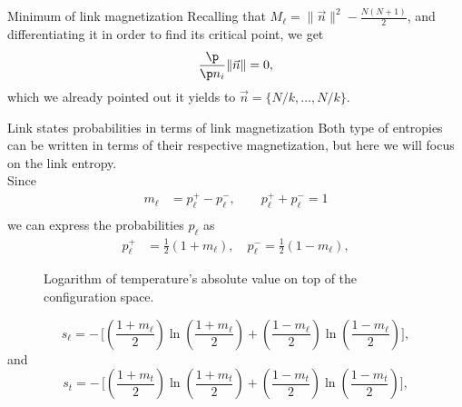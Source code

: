 \begin{frame}{Minimum of link magnetization}
Recalling that $M_\ell = \|\vec{n}\|^2  - \frac{N(N+1)}{2}$, and differentiating it in order to find its critical point, we get 
$$\frac{\p}{\p n_i} \|\vec{n}\| =0,$$
which we already pointed out it yields to $\vec{n} = \{N / k, \ldots, N / k \}$.
\end{frame}

\begin{frame}{Link states probabilities in terms of link magnetization}
Both type of  entropies can be written in terms of their respective magnetization, but here we will focus on the link entropy.\\[1em]

Since
\begin{align*}
	m_\ell &= p_{\ell}^{+} - p_{\ell}^{-},\qquad  p_{\ell}^{+} + p_{\ell}^{-} = 1\\
\end{align*}
we can express the probabilities $p_{\ell}$ as
\begin{align*}
    p_\ell^{+} &= \frac{1}{2}(1+m_\ell), \quad p_\ell^{-} = \frac{1}{2}(1-m_\ell),%
\end{align*}
\end{frame}

\begin{frame}
 \begin{figure}
    \centering
	\caption{Logarithm of temperature's absolute value on top of the configuration space.}
	\label{fig:Tlog}

 \end{figure}
\end{frame}

\begin{frame}
\begin{equation}
        s_\ell = - \, \Biggr[\left(\frac{1+m_\ell}{2}\right) \ln\left(\frac{1+m_\ell}{2}\right) + \left(\frac{1-m_\ell}{2}\right)\ln \left(\frac{1-m_\ell}{2}\right)\Biggr]\label{eq:sl_m}
,\end{equation}
and
\begin{equation}
        s_t = - \, \Biggr[\left(\frac{1+m_t}{2}\right) \ln\left(\frac{1+m_t}{2}\right) + \left(\frac{1-m_t}{2}\right)\ln \left(\frac{1-m_t}{2}\right)\Biggr],\label{eq:st_m}
\end{equation}
\end{frame}

